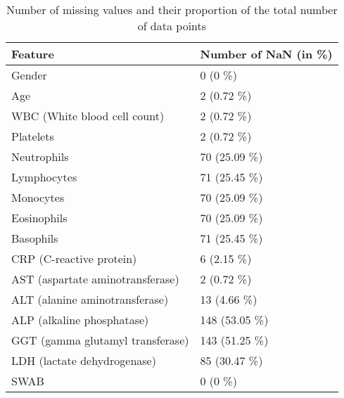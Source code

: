 \begin{table}
\centering
\begin{tabular}{ll}
Feature                          & Number of NaN (in \%) \\ \hline
Gender                           & 0 (0 \%)              \\
Age                              & 2 (0.72 \%)           \\
WBC (White blood cell count)     & 2 (0.72 \%)           \\
Platelets                        & 2 (0.72 \%)           \\
Neutrophils                      & 70 (25.09 \%)         \\
Lymphocytes                      & 71 (25.45 \%)         \\
Monocytes                        & 70 (25.09 \%)         \\
Eosinophils                      & 70 (25.09 \%)         \\
Basophils                        & 71 (25.45 \%)         \\
CRP (C-reactive protein)         & 6 (2.15 \%)           \\
AST (aspartate aminotransferase) & 2 (0.72 \%)           \\
ALT (alanine aminotransferase)   & 13 (4.66 \%)          \\
ALP (alkaline phosphatase)       & 148 (53.05 \%)        \\
GGT (gamma glutamyl transferase) & 143 (51.25 \%)        \\
LDH (lactate dehydrogenase)      & 85 (30.47 \%)         \\
SWAB                             & 0 (0 \%)             
\end{tabular}
\caption{Number of missing values and their proportion of the total number of 
data 
points}
\label{tab:nan-overview}
\end{table}
